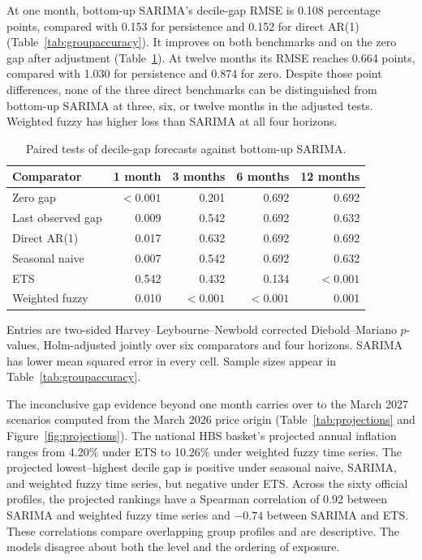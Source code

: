 \documentclass[11pt,a4paper]{article}
\begin{document}
At one month, bottom-up SARIMA's decile-gap RMSE is 0.108 percentage points, compared with 0.153 for persistence and 0.152 for direct AR(1) (Table~\ref{tab:groupaccuracy}). It improves on both benchmarks and on the zero gap after adjustment (Table~\ref{tab:gaptests}). At twelve months its RMSE reaches 0.664 points, compared with 1.030 for persistence and 0.874 for zero. Despite those point differences, none of the three direct benchmarks can be distinguished from bottom-up SARIMA at three, six, or twelve months in the adjusted tests. Weighted fuzzy has higher loss than SARIMA at all four horizons.

\begin{table}[htbp]\centering\small
\caption{Paired tests of decile-gap forecasts against bottom-up SARIMA.}
\label{tab:gaptests}
\begin{tabular}{@{}lrrrr@{}}\toprule
Comparator & 1 month & 3 months & 6 months & 12 months \\ \midrule
Zero gap & $<0.001$ & 0.201 & 0.692 & 0.692 \\
Last observed gap & 0.009 & 0.542 & 0.692 & 0.632 \\
Direct AR(1) & 0.017 & 0.632 & 0.692 & 0.692 \\
Seasonal naive & 0.007 & 0.542 & 0.692 & 0.632 \\
ETS & 0.542 & 0.432 & 0.134 & $<0.001$ \\
Weighted fuzzy & 0.010 & $<0.001$ & $<0.001$ & 0.001 \\
\bottomrule\end{tabular}
\par\smallskip\begin{minipage}{0.90\linewidth}\footnotesize Entries are two-sided Harvey--Leybourne--Newbold corrected Diebold--Mariano $p$-values, Holm-adjusted jointly over six comparators and four horizons. SARIMA has lower mean squared error in every cell. Sample sizes appear in Table~\ref{tab:groupaccuracy}.\end{minipage}
\end{table}

The inconclusive gap evidence beyond one month carries over to the March 2027 scenarios computed from the March 2026 price origin (Table~\ref{tab:projections} and Figure~\ref{fig:projections}). The national HBS basket's projected annual inflation ranges from 4.20\% under ETS to 10.26\% under weighted fuzzy time series. The projected lowest--highest decile gap is positive under seasonal naive, SARIMA, and weighted fuzzy time series, but negative under ETS. Across the sixty official profiles, the projected rankings have a Spearman correlation of 0.92 between SARIMA and weighted fuzzy time series and $-0.74$ between SARIMA and ETS. These correlations compare overlapping group profiles and are descriptive. The models disagree about both the level and the ordering of exposure.
\end{document}
